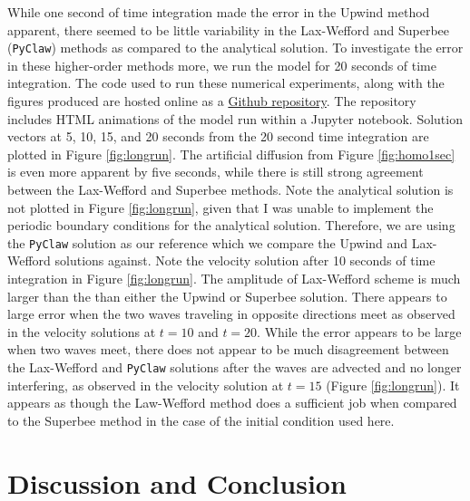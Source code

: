 \documentclass[review,onefignum,onetabnum]{siamart171218}
\begin{document}
While one second of time integration made the error in the Upwind method apparent, there seemed to be little variability in the Lax-Wefford and Superbee (\texttt{PyClaw}) methods as compared to the analytical solution. To investigate the error in these higher-order methods more, we run the model for 20 seconds of time integration. The code used to run these numerical experiments, along with the figures produced are hosted online as a \href{https://github.com/andrewdnolan/MATH-709-Final-Project}{Github repository}. The repository includes HTML animations of the model run within a Jupyter notebook. Solution vectors at 5, 10, 15, and 20 seconds from the 20 second time integration are plotted in Figure \ref{fig:longrun}. The artificial diffusion from Figure \ref{fig:homo1sec} is even more apparent by five seconds, while there is still strong agreement between the Lax-Wefford and Superbee methods. Note the analytical solution is not plotted in Figure \ref{fig:longrun}, given that I was unable to implement the periodic boundary conditions for the analytical solution. Therefore, we are using the \texttt{PyClaw} solution as our reference which we compare the Upwind and Lax-Wefford solutions against. Note the velocity solution after 10 seconds of time integration in Figure \ref{fig:longrun}. The amplitude of Lax-Wefford scheme is much larger than the than either the Upwind or Superbee solution. There appears to large error when the two waves traveling in opposite directions meet as observed in the velocity solutions at $t=10$ and $t=20$. While the error appears to be large when two waves meet, there does not appear to be much disagreement between the Lax-Wefford and \texttt{PyClaw} solutions after the waves are advected and no longer interfering, as observed in the velocity solution at $t=15$ (Figure \ref{fig:longrun}).  It appears as though the Law-Wefford method does a sufficient job when compared to the Superbee method in the case of the initial condition used here.

\section{Discussion and Conclusion}
\end{document}
